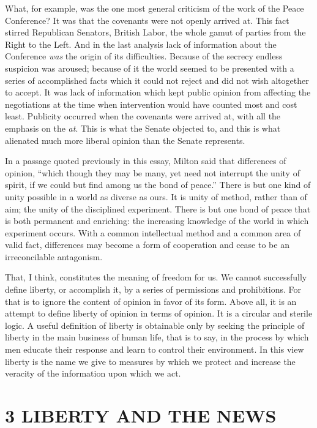 \documentclass[openany,nobib,nohyper]{tufte-book}
\let\oldchapter\chapter
\def\chapter{%
  \setcounter{footnote}{0}%
  \oldchapter
}
\begin{document}
What, for example, was the one most general criticism of the work of the
Peace Conference? It was that the covenants were not openly arrived at.
This fact stirred Republican Senators, British Labor, the whole gamut of
parties from the Right to the Left. And in the last analysis lack of
information about the Conference \emph{was} the origin of its
difficulties. Because of the secrecy endless suspicion was aroused;
because of it the world seemed to be presented with a series of
accomplished facts which it could not reject and did not wish altogether
to accept. It was lack of information which kept public opinion from
affecting the negotiations at the time when intervention would have
counted most and cost least. Publicity occurred when the covenants were
arrived at, with all the emphasis on the \emph{at}. This is what the
Senate objected to, and this is what alienated much more liberal opinion
than the Senate represents.

In a passage quoted previously in this essay, Milton said that
differences of opinion, ``which though they may be many, yet need not
interrupt the unity of spirit, if we could but find among us the bond of
peace.'' There is but one kind of unity possible in a world as diverse
as ours. It is unity of method, rather than of aim; the unity of the
disciplined experiment. There is but one bond of peace that is both
permanent and enriching: the increasing knowledge of the world in which
experiment occurs. With a common intellectual method and a common area
of valid fact, differences may become a form of cooperation and cease to
be an irreconcilable antagonism.

That, I think, constitutes the meaning of freedom for us. We cannot
successfully define liberty, or accomplish it, by a series of
permissions and prohibitions. For that is to ignore the content of
opinion in favor of its form. Above all, it is an attempt to define
liberty of opinion in terms of opinion. It is a circular and sterile
logic. A useful definition of liberty is obtainable only by seeking the
principle of liberty in the main business of human life, that is to say,
in the process by which men educate their response and learn to control
their environment. In this view liberty is the name we give to measures
by which we protect and increase the veracity of the information upon
which we act.

\newpage
\thispagestyle{plain} %
\mbox{}

\chapter[3 \hspace*{1mm} LIBERTY AND THE NEWS]{3 LIBERTY AND THE NEWS}
\label{ch:LIBERTY-NEWS}
\end{document}
